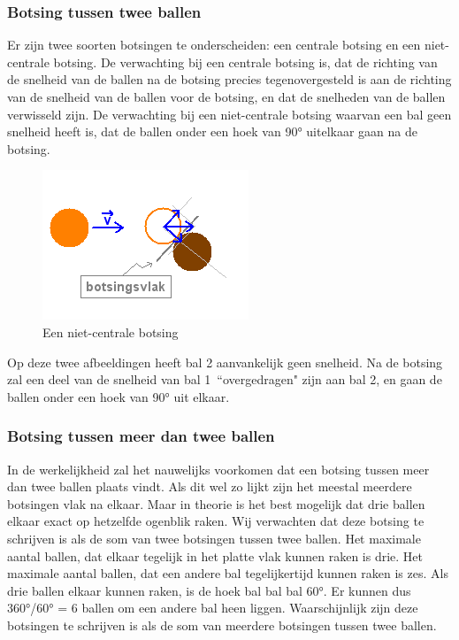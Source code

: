 \documentclass[12pt,a4paper]{article}
\begin{document}
	\subsubsection{Botsing tussen twee ballen}
	Er zijn twee soorten botsingen te onderscheiden: een centrale botsing en een niet-centrale botsing.
De verwachting bij een centrale botsing is, dat de richting van de snelheid van de ballen na de botsing precies tegenovergesteld is aan de richting van de snelheid van de ballen voor de botsing, en dat de snelheden van de ballen verwisseld zijn.
De verwachting bij een niet-centrale botsing waarvan een bal geen snelheid heeft is, dat de ballen onder een hoek van 90° uitelkaar gaan na de botsing. 

\begin{figure}
	\includegraphics{BotsingSchuin.png}
	\caption{Een niet-centrale botsing}
	\label{fig:botsingschuin}
\end{figure}

Op deze twee afbeeldingen heeft bal 2 aanvankelijk geen snelheid. Na de botsing zal een deel van de snelheid van bal 1\ ``overgedragen" zijn aan bal 2, en gaan de ballen onder een hoek van 90° uit elkaar.

	\subsubsection{Botsing tussen meer dan twee ballen}
	In de werkelijkheid zal het nauwelijks voorkomen dat een botsing tussen meer dan twee ballen plaats vindt. Als dit wel zo lijkt zijn het meestal meerdere botsingen vlak na elkaar. Maar in theorie is het best mogelijk dat drie ballen elkaar exact op hetzelfde ogenblik raken. Wij verwachten dat deze botsing te schrijven is als de som van twee botsingen tussen twee ballen.
Het maximale aantal ballen, dat elkaar tegelijk in het platte vlak kunnen raken is drie. Het maximale aantal ballen, dat een andere bal tegelijkertijd kunnen raken is zes. Als drie ballen elkaar kunnen raken, is de hoek bal bal bal 60°. Er kunnen dus 360°/60° = 6 ballen om een andere bal heen liggen. Waarschijnlijk zijn deze botsingen te schrijven is als de som van meerdere botsingen tussen twee ballen.
\end{document}
